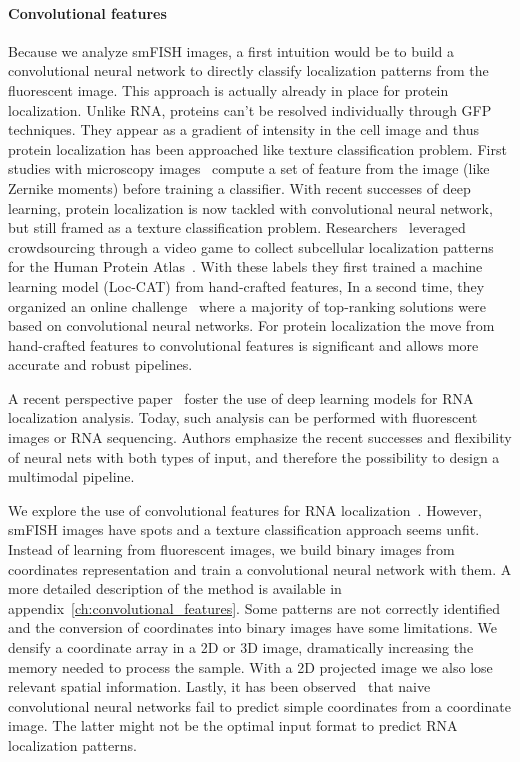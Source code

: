 \paragraph{Convolutional features}

Because we analyze \ac{smFISH} images, a first intuition would be to build a convolutional neural network to directly classify localization patterns from the fluorescent image.
This approach is actually already in place for protein localization.
Unlike \ac{RNA}, proteins can't be resolved individually through \ac{GFP} techniques.
They appear as a gradient of intensity in the cell image and thus protein localization has been approached like texture classification problem.
First studies with microscopy images~\cite{boland_automated_1998} compute a set of feature from the image  (like Zernike moments) before training a classifier.
With recent successes of deep learning, protein localization is now tackled with convolutional neural network, but still framed as a texture classification problem.
Researchers~\cite{sullivan_deep_2018} leveraged crowdsourcing through a video game to collect subcellular localization patterns for the Human Protein Atlas~\cite{Uhlen_2015}.
With these labels they first trained a machine learning model (Loc-CAT) from hand-crafted features,
In a second time, they organized an online challenge~\cite{ouyang_analysis_2019} where a majority of top-ranking solutions were based on convolutional neural networks.
For protein localization the move from hand-crafted features to convolutional features is significant and allows more accurate and robust pipelines.

A recent perspective paper~\cite{Savulescu_2021} foster the use of deep learning models for \ac{RNA} localization analysis.
Today, such analysis can be performed with fluorescent images or \ac{RNA} sequencing.
Authors emphasize the recent successes and flexibility of neural nets with both types of input, and therefore the possibility to design a multimodal pipeline.

We explore the use of convolutional features for \ac{RNA} localization~\cite{dubois_deep_2019}.
However, \ac{smFISH} images have spots and a texture classification approach seems unfit.
Instead of learning from fluorescent images, we build binary images from coordinates representation and train a convolutional neural network with them.
A more detailed description of the method is available in appendix~\ref{ch:convolutional_features}.
Some patterns are not correctly identified and the conversion of coordinates into binary images have some limitations.
We densify a coordinate array in a 2D or 3D image, dramatically increasing the memory needed to process the sample.
With a 2D projected image we also lose relevant spatial information.
Lastly, it has been observed~\cite{Rosanne_2018} that naive convolutional neural networks fail to predict simple coordinates from a coordinate image.
The latter might not be the optimal input format to predict \ac{RNA} localization patterns.

